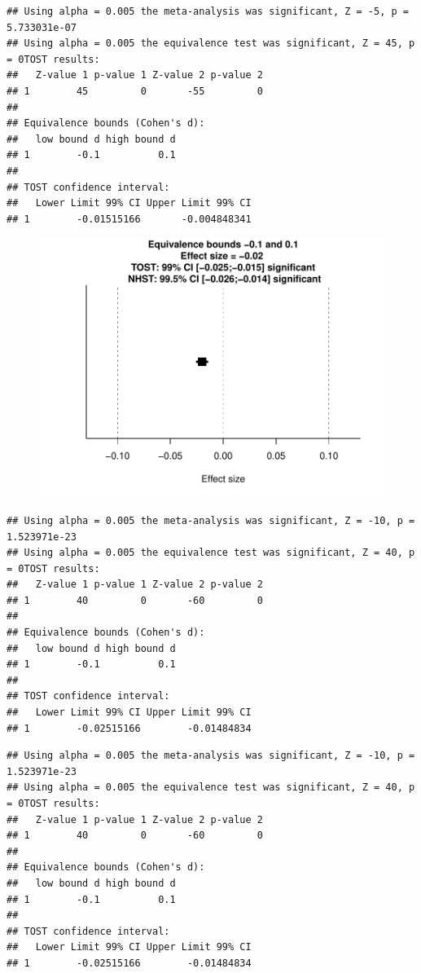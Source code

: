 \documentclass[english,man]{apa6}
\theoremstyle{definition}
\theoremstyle{definition}
\theoremstyle{definition}
\theoremstyle{remark}
\begin{document}
\begin{verbatim}
## Using alpha = 0.005 the meta-analysis was significant, Z = -5, p = 5.733031e-07
## Using alpha = 0.005 the equivalence test was significant, Z = 45, p = 0TOST results:
##   Z-value 1 p-value 1 Z-value 2 p-value 2
## 1        45         0       -55         0
## 
## Equivalence bounds (Cohen's d):
##   low bound d high bound d
## 1        -0.1          0.1
## 
## TOST confidence interval:
##   Lower Limit 99% CI Upper Limit 99% CI
## 1        -0.01515166       -0.004848341
\end{verbatim}

\begin{figure}[htbp]
\centering
\includegraphics{manuscript_files/figure-latex/unnamed-chunk-7-4.pdf}
\caption{}
\end{figure}

\begin{verbatim}
## Using alpha = 0.005 the meta-analysis was significant, Z = -10, p = 1.523971e-23
## Using alpha = 0.005 the equivalence test was significant, Z = 40, p = 0TOST results:
##   Z-value 1 p-value 1 Z-value 2 p-value 2
## 1        40         0       -60         0
## 
## Equivalence bounds (Cohen's d):
##   low bound d high bound d
## 1        -0.1          0.1
## 
## TOST confidence interval:
##   Lower Limit 99% CI Upper Limit 99% CI
## 1        -0.02515166        -0.01484834
\end{verbatim}

\begin{verbatim}
## Using alpha = 0.005 the meta-analysis was significant, Z = -10, p = 1.523971e-23
## Using alpha = 0.005 the equivalence test was significant, Z = 40, p = 0TOST results:
##   Z-value 1 p-value 1 Z-value 2 p-value 2
## 1        40         0       -60         0
## 
## Equivalence bounds (Cohen's d):
##   low bound d high bound d
## 1        -0.1          0.1
## 
## TOST confidence interval:
##   Lower Limit 99% CI Upper Limit 99% CI
## 1        -0.02515166        -0.01484834
\end{verbatim}
\end{document}

